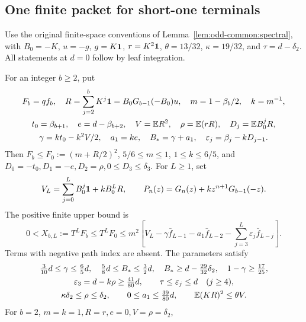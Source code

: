 \subsection{One finite packet for short-one terminals}
\label{sec:short-one-packet}
Use the original finite-space conventions of
Lemma~\ref{lem:odd-common:spectral}, with \(B_0=-K\), \(u=-g\),
\(g=K\mathbf1\), \(r=K^2\mathbf1\), \(\theta=13/32\), \(\kappa=19/32\),
and \(\tau=d-\delta_2\).
All statements at \(d=0\) follow by leaf integration.

\begin{lemma}\label{lem:short-one:packet}
For an integer \(b\ge2\), put
\begin{equation}\label{eq:short-one:data}
\begin{gathered}
 F_b=qf_b,\quad R=\sum_{j=2}^bK^j\mathbf1=B_0G_{b-1}(-B_0)u,\quad
 m=1-\beta_b/2,\quad k=m^{-1},\\
 t_0=\beta_{b+1},\quad e=d-\beta_{b+2},\quad
 V=\mathbb E R^2,\quad \rho=\mathbb E(rR),\quad D_j=\mathbb E B_0^jR,\\
 \gamma=kt_0-k^2V/2,\quad a_1=ke,\quad B_*=\gamma+a_1,\quad
 \varepsilon_j=\beta_j-kD_{j-1}.
\end{gathered}
\end{equation}
Then \(F_b\le F_0:=(m+R/2)^2\), \(5/6\le m\le1\), \(1\le k\le6/5\),
and \(D_0=-t_0,D_1=-e,D_2=\rho,0\le D_3\le\delta_3\).
For \(L\ge1\), set
\[
 V_L=\sum_{j=0}^LB_0^j\mathbf1+kB_0^LR,\qquad
 P_n(z)=G_n(z)+kz^{n+1}G_{b-1}(-z).
\]
The positive finite upper bound is
\begin{equation}\label{eq:short-one:propagation}
 0<X_{b,L}:=T^LF_b\le T^LF_0\le m^2\left[
 V_L-\gamma\bar f_{L-1}-a_1\bar f_{L-2}
       -\sum_{j=3}^L\varepsilon_j\bar f_{L-j}\right].
\end{equation}
Terms with negative path index are absent. The parameters satisfy
\begin{equation}\label{eq:short-one:losses}
\begin{gathered}
 \tfrac3{10}d\le\gamma\le\tfrac65d,\quad
 \tfrac58d\le B_*\le\tfrac32d,\quad
 B_*\ge d-\tfrac{29}{32}\delta_2,\quad
 1-\gamma\ge\tfrac{17}{25},\\
 \varepsilon_3=d-k\rho\ge\tfrac{41}{80}d,\qquad
 \tau\le\varepsilon_j\le d\quad(j\ge4),\\
 \kappa\delta_2\le\rho\le\delta_2,\qquad
 0\le a_1\le\tfrac{39}{80}d,\qquad
 \mathbb E(KR)^2\le\theta V.
\end{gathered}
\end{equation}
For \(b=2\), \(m=k=1,R=r,e=0,V=\rho=\delta_2\),

\end{lemma}
